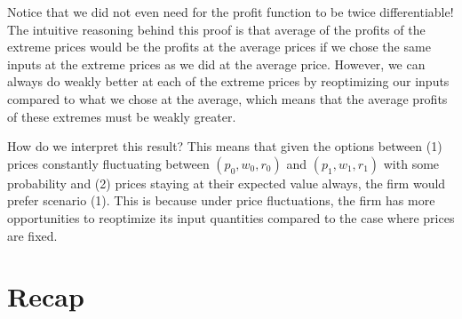 Notice that we did not even need for the profit function to be twice differentiable! The intuitive reasoning behind this proof is that average of the profits of the extreme prices would be the profits at the average prices if we chose the same inputs at the extreme prices as we did at the average price. However, we can always do weakly better at each of the extreme prices by reoptimizing our inputs compared to what we chose at the average, which means that the average profits of these extremes must be weakly greater.

How do we interpret this result? This means that given the options between (1) prices constantly fluctuating between $(p_0, w_0, r_0)$ and $(p_1, w_1, r_1)$ with some probability and (2) prices staying at their expected value always, the firm would prefer scenario (1). This is because under price fluctuations, the firm has more opportunities to reoptimize its input quantities compared to the case where prices are fixed.

\section*{Recap}

